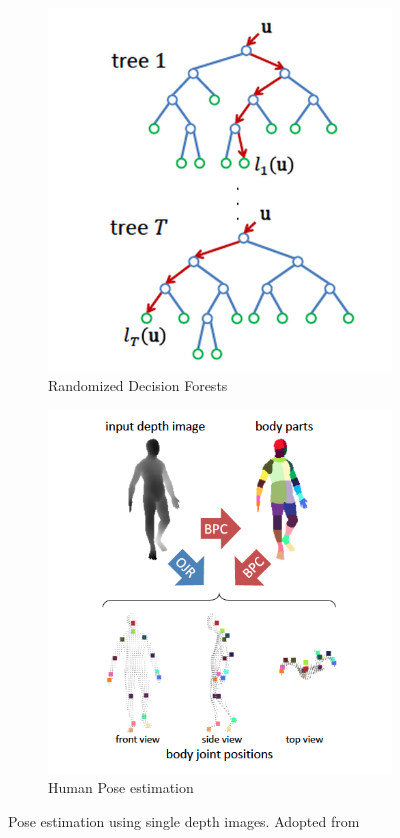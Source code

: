 \begin{figure}[H]
\centering
\begin{subfigure}[b]{0.35\textwidth}
\includegraphics[width=\textwidth]{assets/forest.png}
\caption{Randomized Decision Forests}
\label{fig:decision_forests}
\end{subfigure}
\begin{subfigure}[b]{0.35\textwidth}
\includegraphics[width=\textwidth]{assets/kinect_approaches.png}
\caption{Human Pose estimation}
\label{fig:kinect_pose}
\end{subfigure}
\caption[Human pose estimation using single depth images]{Pose estimation using single depth images. {Adopted from \cite{shotton2013efficient}}}
\end{figure} 
